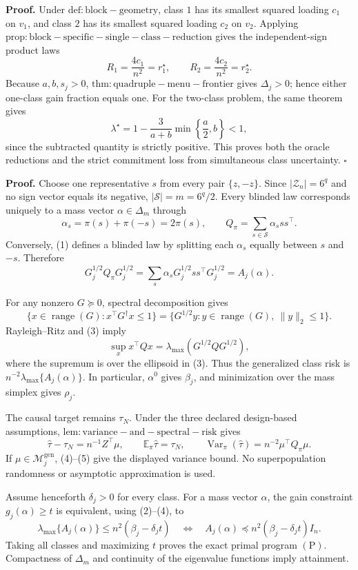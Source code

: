 \textbf{Proof.}
Under \(\mathrm{def:block-geometry}\), class \(1\) has its smallest squared loading \(c_1\) on \(v_1\), and class \(2\) has its smallest squared loading \(c_2\) on \(v_2\).  Applying \(\mathrm{prop:block-specific-single-class-reduction}\) gives the independent-sign product laws
\[
R_1=\frac{4c_1}{n^2}=r_1^\star,
\qquad
R_2=\frac{4c_2}{n^2}=r_2^\star. \tag{1}
\]
Because \(a,b,s_j>0\), \(\mathrm{thm:quadruple-menu-frontier}\) gives \(\Delta_j>0\); hence either one-class gain fraction equals one.  For the two-class problem, the same theorem gives
\[
\lambda^\star
=1-\frac3{a+b}\min\left\{\frac a2,b\right\}<1, \tag{2}
\]
since the subtracted quantity is strictly positive.  This proves both the oracle reductions and the strict commitment loss from simultaneous class uncertainty. \(\square\)

\textbf{Proof.}
Choose one representative \(s\) from every pair \(\{z,-z\}\).  Since \(|\mathcal Z_n|=6^q\) and no sign vector equals its negative, \(|\mathscr S|=m=6^q/2\).  Every blinded law corresponds uniquely to a mass vector \(\alpha\in\Delta_m\) through
\[
\alpha_s=\pi(s)+\pi(-s)=2\pi(s),
\qquad
Q_\pi=\sum_{s\in\mathscr S}\alpha_sss^\top. \tag{1}
\]
Conversely, (1) defines a blinded law by splitting each \(\alpha_s\) equally between \(s\) and \(-s\).  Therefore
\[
G_j^{1/2}Q_\pi G_j^{1/2}
=\sum_s\alpha_sG_j^{1/2}ss^\top G_j^{1/2}
=A_j(\alpha). \tag{2}
\]

For any nonzero \(G\succeq0\), spectral decomposition gives
\[
\{x\in\operatorname{range}(G):x^\top G^\dagger x\le1\}
=\{G^{1/2}y:y\in\operatorname{range}(G),\ \|y\|_2\le1\}. \tag{3}
\]
Rayleigh--Ritz and (3) imply
\[
\sup_x x^\top Qx=\lambda_{\max}(G^{1/2}QG^{1/2}), \tag{4}
\]
where the supremum is over the ellipsoid in (3).  Thus the generalized class risk is \(n^{-2}\lambda_{\max}\{A_j(\alpha)\}\).  In particular, \(\alpha^0\) gives \(\beta_j\), and minimization over the mass simplex gives \(\rho_j\).

The causal target remains \(\tau_N\).  Under the three declared design-based assumptions, \(\mathrm{lem:variance-and-spectral-risk}\) gives
\[
\widehat\tau-\tau_N=n^{-1}Z^\top\mu,
\qquad
\mathbb E_\pi\widehat\tau=\tau_N,
\qquad
\operatorname{Var}_\pi(\widehat\tau)=n^{-2}\mu^\top Q_\pi\mu. \tag{5}
\]
If \(\mu\in\mathcal M_j^{\mathrm{gen}}\), (4)--(5) give the displayed variance bound.  No superpopulation randomness or asymptotic approximation is used.

Assume henceforth \(\delta_j>0\) for every class.  For a mass vector \(\alpha\), the gain constraint \(g_j(\alpha)\ge t\) is equivalent, using (2)--(4), to
\[
\lambda_{\max}\{A_j(\alpha)\}
\le n^2(\beta_j-\delta_jt)
\quad\Longleftrightarrow\quad
A_j(\alpha)\preceq n^2(\beta_j-\delta_jt)I_n. \tag{6}
\]
Taking all classes and maximizing \(t\) proves the exact primal program \((\mathrm P)\).  Compactness of \(\Delta_m\) and continuity of the eigenvalue functions imply attainment.

